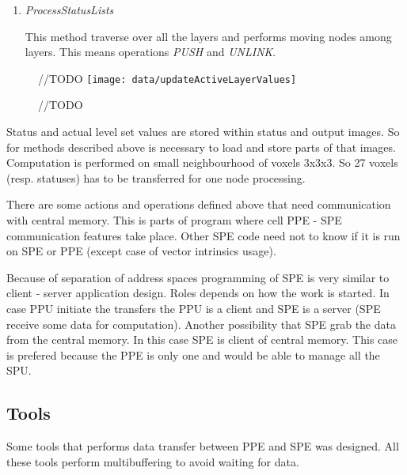 \begin{enumerate}
\item \emph{ProcessStatusLists}
\par
This method traverse over all the layers and performs moving nodes among layers.
This means operations \emph{PUSH} and \emph{UNLINK}.
\end{enumerate}

\begin{figure}	//TODO
    \centering
    \texttt{[image: data/updateActiveLayerValues]}
    \caption[Diagram of new design components]{//TODO}
    \label{fg:updateActiveLayerValues}
\end{figure}

Status and actual level set values are stored within status and output images.
So for methods described above is necessary to load and store parts of that images.
Computation is performed on small neighbourhood of voxels 3x3x3.
So 27 voxels (resp. statuses) has to be transferred for one node processing.

There are some actions and operations defined above that need communication with central memory.
This is parts of program where cell PPE - SPE communication features take place.
Other SPE code need not to know if it is run on SPE or PPE (except case of vector intrinsics usage).

Because of separation of address spaces programming of SPE is very similar to client - server application design.
Roles depends on how the work is started.
In case PPU initiate the transfers the PPU is a client and SPE is a server (SPE receive some data for computation).
Another possibility that SPE grab the data from the central memory.
In this case SPE is client of central memory.
This case is prefered because the PPE is only one and would be able to manage all the SPU.

\subsection{Tools}
Some tools that performs data transfer between PPE and SPE was designed.
All these tools perform multibuffering to avoid waiting for data.

